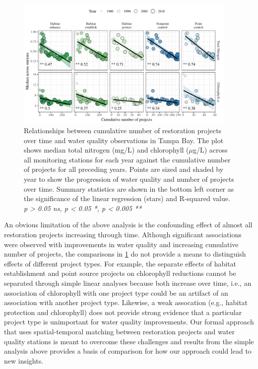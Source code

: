 \documentclass[]{article}
\begin{document}
\begin{figure}
\centerline{\includegraphics[width = 0.95\textwidth]{figs/cumprj.pdf}}
\caption{Relationships between cumulative number of restoration projects over time and water quality observations in Tampa Bay. The plot shows median total nitrogen (mg/L) and chlorophyll ($\mu$g/L) across all monitoring stations for each year against the cumulative number of projects for all preceding years.  Points are sized and shaded by year to show the progression of water quality and number of projects over time.  Summary statistics are shown in the bottom left corner as the significance of the linear regression (stars) and R-squared value. \textit{p > 0.05 ns, p < 0.05 *, p < 0.005 **}}
\label{fig:cumprj}
\end{figure}

An obvious limitation of the above analysis is the confounding effect of
almost all restoration projects increasing through time. Although
significant associations were observed with improvements in water
quality and increasing cumulative number of projects, the comparisons in
\cref{fig:cumprj} do not provide a means to distinguish effects of
different project types. For example, the separate effects of habitat
establishment and point source projects on chlorophyll reductions cannot
be separated through simple linear analyses because both increase over
time, i.e., an association of chlorophyll with one project type could be
an artifact of an association with another project type. Likewise, a
weak assocation (e.g., habitat protection and chlorophyll) does not
provide strong evidence that a particular project type is unimportant
for water quality improvements. Our formal approach that uses
spatial-temporal matching between restoration projects and water quality
stations is meant to overcome these challenges and results from the
simple analysis above provides a basis of comparison for how our
approach could lead to new insights.
\end{document}
